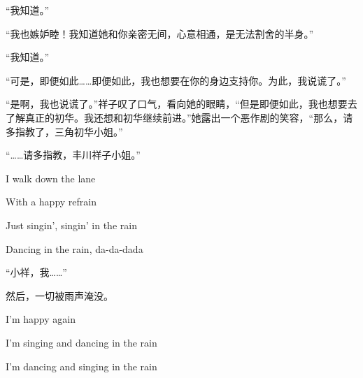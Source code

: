 \documentclass{article}
\begin{document}
“我知道。”



“我也嫉妒睦！我知道她和你亲密无间，心意相通，是无法割舍的半身。”



“我知道。”



“可是，即便如此……即便如此，我也想要在你的身边支持你。为此，我说谎了。”



“是啊，我也说谎了。”祥子叹了口气，看向她的眼睛，“但是即便如此，我也想要去了解真正的初华。我还想和初华继续前进。”她露出一个恶作剧的笑容，“那么，请多指教了，三角初华小姐。”



“……请多指教，丰川祥子小姐。”



I walk down the lane

With a happy refrain

Just singin', singin' in the rain

Dancing in the rain, da-da-dada



“小祥，我……”



然后，一切被雨声淹没。



\newpage



I'm happy again

I'm singing and dancing in the rain

I'm dancing and singing in the rain
\end{document}
